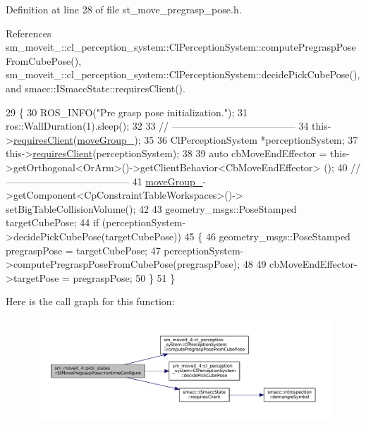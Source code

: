 Definition at line 28 of file st\+\_\+move\+\_\+pregrasp\+\_\+pose.\+h.



References sm\+\_\+moveit\+\_\+::cl\+\_\+perception\+\_\+system\+::\+Cl\+Perception\+System\+::compute\+Pregrasp\+Pose\+From\+Cube\+Pose(), sm\+\_\+moveit\+\_\+::cl\+\_\+perception\+\_\+system\+::\+Cl\+Perception\+System\+::decide\+Pick\+Cube\+Pose(), and smacc\+::\+I\+Smacc\+State\+::requires\+Client().


\begin{DoxyCode}
29             \{
30                 ROS\_INFO(\textcolor{stringliteral}{"Pre grasp pose initialization."});
31                 ros::WallDuration(1).sleep();
32 
33                 \textcolor{comment}{// --------------------------------------}
34                 this->\hyperlink{classsmacc_1_1ISmaccState_a7f95c9f0a6ea2d6f18d1aec0519de4ac}{requiresClient}(\hyperlink{structsm__moveit__4_1_1pick__states_1_1StMovePregraspPose_a7ac8229ab37dba1b2eb43668e4adceea}{moveGroup\_});
35                 
36                 ClPerceptionSystem *perceptionSystem;
37                 this->\hyperlink{classsmacc_1_1ISmaccState_a7f95c9f0a6ea2d6f18d1aec0519de4ac}{requiresClient}(perceptionSystem);
38 
39                 \textcolor{keyword}{auto} cbMoveEndEffector = this->getOrthogonal<OrArm>()->getClientBehavior<CbMoveEndEffector>
      ();
40                 \textcolor{comment}{// --------------------------------------}
41                 \hyperlink{structsm__moveit__4_1_1pick__states_1_1StMovePregraspPose_a7ac8229ab37dba1b2eb43668e4adceea}{moveGroup\_}->getComponent<CpConstraintTableWorkspaces>()->
      setBigTableCollisionVolume();
42 
43                 geometry\_msgs::PoseStamped targetCubePose;
44                 \textcolor{keywordflow}{if} (perceptionSystem->decidePickCubePose(targetCubePose))
45                 \{
46                     geometry\_msgs::PoseStamped pregraspPose = targetCubePose;
47                     perceptionSystem->computePregraspPoseFromCubePose(pregraspPose);
48 
49                     cbMoveEndEffector->targetPose = pregraspPose;
50                 \}
51             \}
\end{DoxyCode}
Here is the call graph for this function\+:
\nopagebreak
\begin{figure}[H]
\begin{center}
\leavevmode
\includegraphics[width=350pt]{structsm__moveit__4_1_1pick__states_1_1StMovePregraspPose_ae9ffdf77d89169b5f4fb2cb2fadd56fc_cgraph}
\end{center}
\end{figure}
